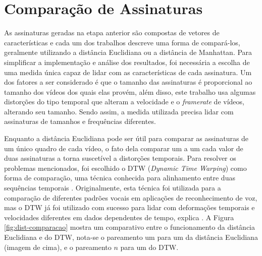 



\section{Comparação de Assinaturas}
\label{sec:met-comparacao}

As assinaturas geradas na etapa anterior são compostas de vetores de características e cada um dos trabalhos descreve uma forma de compará-los, geralmente utilizando a distância Euclidiana ou a distância de Manhattan. Para simplificar a implementação e análise dos resultados, foi necessária a escolha de uma medida única capaz de lidar com as características de cada assinatura. Um dos fatores a ser considerado é que o tamanho das assinaturas é proporcional ao tamanho dos vídeos dos quais elas provém, além disso, este trabalho usa algumas distorções do tipo temporal que alteram a velocidade e o \textit{framerate} de vídeos, alterando seu tamanho. Sendo assim, a medida utilizada precisa lidar com assinaturas de tamanhos e frequências diferentes.

Enquanto a distância Euclidiana pode ser útil para comparar as assinaturas de um único quadro de cada vídeo, o fato dela comparar um a um cada valor de duas assinaturas a torna suscetível a distorções temporais. Para resolver os problemas mencionados, foi escolhido o DTW (\textit{Dynamic Time Warping}) como forma de comparação, uma técnica conhecida para alinhamento entre duas sequências temporais \cite{muller2007dynamic}. Originalmente, esta técnica foi utilizada para a comparação de diferentes padrões vocais em aplicações de reconhecimento de voz, mas o DTW já foi utilizado com sucesso para lidar com deformações temporais e velocidades diferentes em dados dependentes de tempo, explica . A Figura \ref{fig:dist-comparacao} mostra um comparativo entre o funcionamento da distância Euclidiana e do DTW, nota-se o pareamento um para um da distância Euclidiana (imagem de cima), e o pareamento $n$ para um do DTW.

